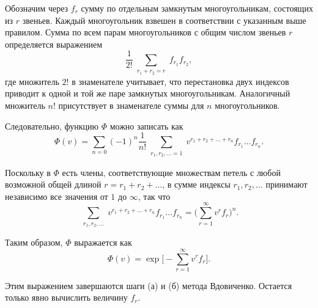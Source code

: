 Обозначим через $f_{r}$ сумму по отдельным замкнутым многоугольникам, состоящих из $r$ звеньев. Каждый многоугольник взвешен в соответствии с указанным выше правилом. Сумма по всем парам многоугольников с общим числом звеньев $r$ определяется выражением
\begin{equation*}
\frac{1}{2!} \sum_{\substack{r_1 + r_2 = r}} f_{r_1} f_{r_2},
\end{equation*}
где множитель $2!$ в знаменателе учитывает, что перестановка двух индексов приводит к одной и той же паре замкнутых многоугольникам. Аналогичный множитель $n!$ присутствует в знаменателе суммы для $n$ многоугольников.

Следовательно, функцию $\Phi$ можно записать как
\begin{equation}
\Phi(v) = \sum_{n = 0} (-1)^n \frac{1}{n!} \sum_{\substack{r_1, r_2, \dots = 1}} v^{r_1 + r_2 + \dots + r_n} f_{r_1} \dots f_{r_n}.
\end{equation}

Поскольку в $\Phi$ есть члены, соответствующие множествам петель с любой возможной общей длиной $r = r_1 + r_2 + \dots$, в сумме  индексы $r_1, r_2, \dots$ принимают независимо все значения от $1$ до $\infty$, так что
\begin{equation*}
\sum_{\substack{r_1, r_2, \dots}} v^{r_1 + r_2 + \dots + r_n} f_{r_1} \dots f_{r_n} = \bigg(\sum_{r=1}^{\infty}v^r f_{r}\bigg)^n.
\end{equation*}

Таким образом, $\Phi$ выражается как
\begin{equation}
\Phi (v) = \exp{\bigg[-\sum_{r=1}^{\infty}v^r f_{r}\bigg]}.
\label{Phi}
\end{equation}

Этим выражением завершаются шаги (а) и (б) метода Вдовиченко.
Остается только явно вычислить величину $f_{r}$.


